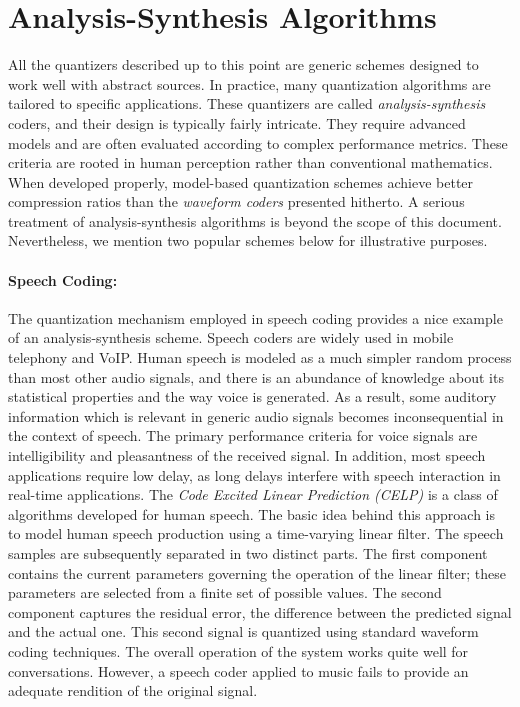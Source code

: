 \section{Analysis-Synthesis Algorithms}

All the quantizers described up to this point are generic schemes designed to work well with abstract sources.
In practice, many quantization algorithms are tailored to specific applications.
These quantizers are called \emph{analysis-synthesis} coders, and their design is typically fairly intricate.
They require advanced models and are often evaluated according to complex performance metrics.
These criteria are rooted in human perception rather than conventional mathematics.
When developed properly, model-based quantization schemes achieve better compression ratios than the \emph{waveform coders} presented hitherto.
A serious treatment of analysis-synthesis algorithms is beyond the scope of this document.
Nevertheless, we mention two popular schemes below for illustrative purposes.

\paragraph{Speech Coding:}
The quantization mechanism employed in speech coding provides a nice example of an analysis-synthesis scheme.
Speech coders are widely used in mobile telephony and VoIP.
Human speech is modeled as a much simpler random process than most other audio signals, and there is an abundance of knowledge about its statistical properties and the way voice is generated.
As a result, some auditory information which is relevant in generic audio signals becomes inconsequential in the context of speech.
The primary performance criteria for voice signals are intelligibility and pleasantness of the received signal.
In addition, most speech applications require low delay, as long delays interfere with speech interaction in real-time applications.
The \emph{Code Excited Linear Prediction (CELP)} is a class of algorithms developed for human speech.
The basic idea behind this approach is to model human speech production using a time-varying linear filter.
The speech samples are subsequently separated in two distinct parts.
The first component contains the current parameters governing the operation of the linear filter; these parameters are selected from a finite set of possible values.
The second component captures the residual error, the difference between the predicted signal and the actual one.
This second signal is quantized using standard waveform coding techniques.
The overall operation of the system works quite well for conversations.
However, a speech coder applied to music fails to provide an adequate rendition of the original signal.

